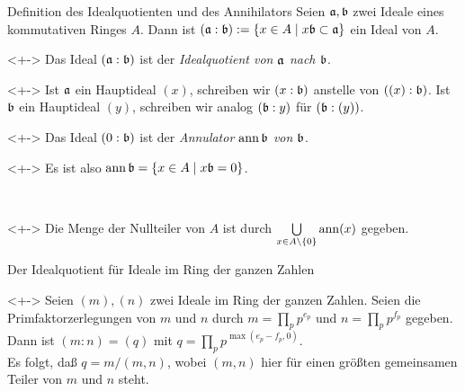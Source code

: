 \begin{frame}{Definition des Idealquotienten und des Annihilators}
	Seien \(\mathfrak{a}, \mathfrak{b}\) zwei Ideale eines kommutativen Ringes \(A\).
	Dann ist \((\mathfrak{a} : \mathfrak{b}) := \{x \in A \mid x \mathfrak{b} \subset \mathfrak{a}\}\)
	ein Ideal von \(A\).
	\begin{definition}<+->
		Das Ideal \((\mathfrak{a} : \mathfrak{b})\) ist der \emph{Idealquotient von
		\(\mathfrak{a}\) nach \(\mathfrak{b}\)}.
	\end{definition}
	\begin{notation}<+->
		Ist \(\mathfrak{a}\) ein Hauptideal \((x)\), schreiben wir \((x : \mathfrak{b})\)
		anstelle von \(((x) : \mathfrak{b})\). Ist \(\mathfrak{b}\) ein Hauptideal \((y)\),
		schreiben wir analog \((\mathfrak{b} : y)\) für \((\mathfrak{b} : (y))\).
	\end{notation}	
	\begin{definition}<+->
		Das Ideal \((0 : \mathfrak{b})\) ist der \emph{Annulator \(\operatorname{ann} \mathfrak{b}\) von
		\(\mathfrak{b}\)}.
	\end{definition}
	\begin{visibleenv}<+->
		Es ist also \(\operatorname{ann} \mathfrak{b} = \{x \in A \mid x \mathfrak{b} = 0\}\).
	\end{visibleenv}
	\\
	\begin{visibleenv}<+->
		Die Menge der Nullteiler von \(A\) ist durch
		\(\bigcup\limits_{x \in A \setminus \{0\}} \operatorname{ann}(x)\)
		gegeben.
	\end{visibleenv}
\end{frame}

\begin{frame}{Der Idealquotient für Ideale im Ring der ganzen Zahlen}
	\begin{example}<+->
		Seien \((m), (n)\) zwei Ideale im Ring der ganzen Zahlen. Seien die
		Primfaktorzerlegungen von \(m\) und \(n\) durch \(m = \prod\limits_p p^{e_p}\)
		und \(n = \prod\limits_p p^{f_p}\) gegeben. Dann ist \((m : n) = (q)\) mit
		\(q = \prod\limits_p p^{\max(e_p - f_p, 0)}\).
		\\
		Es folgt, daß \(q = m/(m, n)\), wobei \((m, n)\) hier für einen größten
		gemeinsamen Teiler von \(m\) und \(n\) steht.
	\end{example}
\end{frame}

